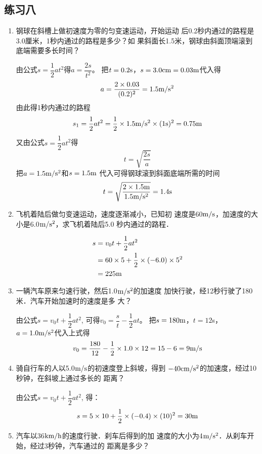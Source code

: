 \subsection{练习八}
\begin{enumerate}
\item      钢球在斜槽上做初速度为零的匀变速运动，开始运动
后0.2秒内通过的路程是3.0厘米，1秒内通过的路程是多少？如
果斜面长1.5米，钢球由斜面顶端滚到底端需要多长时间？
   
\begin{solution}
由公式$s=\dfrac{1}{2}at^2$得$a=\dfrac{2s}{t^2}$。
把$t=0.2{\rm s}$，$s=3.0{\rm cm}=0.03{\rm m}$代入得
\[a=\frac{2\times 0.03}{(0.2)^2}=1.5\text{m}/\text{s}^2\]
由此得1秒内通过的路程
\[s_1=\frac{1}{2}at^2=\frac{1}{2}\times1.5\text{m}/\text{s}^2\times(1{\rm s})^2=0.75{\rm m}\]
又由公式$s=\dfrac{1}{2}at^2$得
\[t=\sqrt{\frac{2s}{a}}\]
把$a=1.5\text{m}/\text{s}^2$和$s=1.5{\rm m}$
代入可得钢球滚到斜面底端所需的时间
\[t= \sqrt{\frac{2\times 1.5{\rm m}}{1.5\text{m}/\text{s}^2}}=1.4{\rm s} \] 
\end{solution}

\item     飞机着陆后做匀变速运动，速度逐渐减小，已知初
速度是60$\text{m}/\text{s}$，加速度的大小是6.0$\text{m}/\text{s}^2$，求飞机着陆后5.0
秒内通过的路程．
   
\begin{solution}
\[\begin{split}
    s&=v_0t+\frac{1}{2}at^2\\
    &=60\times 5+\frac{1}{2}\times (-6.0)\times 5^2\\
    &=225{\rm m}
\end{split}\]
\end{solution}

\item     一辆汽车原来匀速行驶，然后1.0$\text{m}/\text{s}^2$的加速度
加快行驶，经12秒行驶了180米．汽车开始加速时的速度是多
大？
   
\begin{solution}
由公式$s=v_0 t+\dfrac{1}{2}at^2$, 可得$v_0=\dfrac{s}{t}-\dfrac{1}{2}at$。
把$s=180{\rm m}$，$t=12$s，$a=1.0\text{m}/\text{s}^2$代入上式得
\[v_0=\frac{180}{12}-\frac{1}{2}\times 1.0\times 12=15-6=9\text{m}/\text{s}\]   
\end{solution}

\item     骑自行车的人以5.0$\text{m}/\text{s}$的初速度登上斜坡，得到
$-40{\rm cm}/{\rm s}^2$的加速度，经过10秒钟，在斜坡上通过多长的
距离？
   

\begin{solution}
    由公式$s=v_0 t+\dfrac{1}{2}at^2$, 得：
    \[s=5\times 10+\frac{1}{2}\times(-0.4)\times (10)^2=30{\rm m}\]
\end{solution}
\item    汽车以36$\text{km}/\text{h}$的速度行驶．刹车后得到的加
速度的大小为4$\text{m}/\text{s}^2$．从刹车开始，经过3秒钟，汽车通过的
距离是多少？
   

\end{enumerate}
